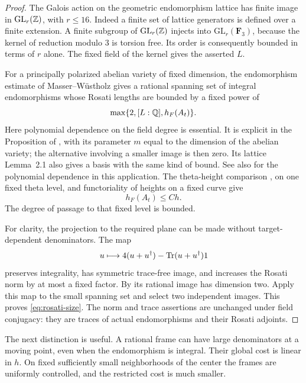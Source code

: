 \begin{proof}
The Galois action on the geometric endomorphism lattice has finite
image in $\mathrm{GL}_r(\mathbb Z)$, with $r\le16$.  Indeed a finite set of
lattice generators is defined over a finite extension.  A finite
subgroup of $\mathrm{GL}_r(\mathbb Z)$ injects into
$\mathrm{GL}_r(\mathbf F_3)$, because the kernel of reduction modulo
$3$ is torsion free.  Its order is consequently bounded in terms of
$r$ alone.  The fixed field of the kernel gives the asserted $L$.

For a principally polarized abelian variety of fixed dimension, the
endomorphism estimate of Masser--W\"ustholz gives a rational spanning
set of integral endomorphisms whose Rosati lengths are bounded by a
fixed power of
\[
 \max\{2,[L:\mathbb Q],h_F(A_t)\}.
\]
Here polynomial dependence on the field degree is essential.  It is
explicit in the Proposition of \cite[Section~4]{MW1994}, with its
parameter $m$ equal to the dimension of the abelian variety; the
alternative involving a smaller image is then zero.  Its lattice
Lemma~2.1 also gives a basis with the same kind of bound.  See also
\cite[Theorem~6.6 and Section~6.7]{DawOrr2022} for the polynomial
dependence in this application.  The theta-height comparison
\cite[Theorem~1.1 and Corollary~1.3]{Pazuki2012}, on one fixed theta
level, and functoriality of heights on a fixed curve give
\[
 h_F(A_t)\le C h.
\]
The degree of passage to that fixed level is bounded.

For clarity, the projection to the required plane can be made without
target-dependent denominators.  The map
\[
 u\longmapsto 4(u+u^\dagger)-\operatorname{Tr}(u+u^\dagger)1
\]
preserves integrality, has symmetric trace-free image, and increases
the Rosati norm by at most a fixed factor.  By
 its rational image has dimension two.  Apply this
map to the small spanning set and select two independent images.
This proves \eqref{eq:rosati-size}.  The norm and trace assertions are
unchanged under field conjugacy: they are traces of actual
endomorphisms and their Rosati adjoints.
\end{proof}

The next distinction is useful.  A rational frame can have large
denominators at a moving point, even when the endomorphism is integral.
Their global cost is linear in $h$.  On fixed sufficiently small
neighborhoods of the center the frames are uniformly controlled, and
the restricted cost is much smaller.

